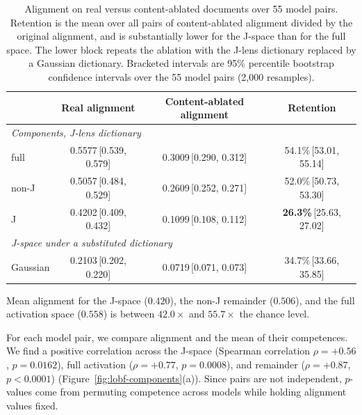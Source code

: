 \documentclass{article}
\begin{document}
\begin{table}
  \centering
  \small
  \caption{Alignment on real versus content-ablated documents over 55 model pairs. Retention is the mean over all pairs of content-ablated alignment divided by the original alignment, and is substantially lower for the J-space than for the full space. The lower block repeats the ablation with the J-lens dictionary replaced by a Gaussian dictionary. Bracketed intervals are 95\% percentile bootstrap confidence intervals over the 55 model pairs (2,000 resamples).}
  \label{tab:surrogate}
  \begin{tabular}{lccc}
    \toprule
             & Real alignment  & Content-ablated alignment  & Retention                                 \\
    \midrule
    \multicolumn{4}{l}{\emph{Components, J-lens dictionary}}                                                   \\
    full     & 0.5577\,{\tiny[0.539, 0.579]} & 0.3009\,{\tiny[0.290, 0.312]} & 54.1\%\,{\tiny[53.01, 55.14]} \\
    non-J     & 0.5057\,{\tiny[0.484, 0.529]} & 0.2609\,{\tiny[0.252, 0.271]} & 52.0\%\,{\tiny[50.73, 53.30]} \\
    J        & 0.4202\,{\tiny[0.409, 0.432]} & 0.1099\,{\tiny[0.108, 0.112]} & \textbf{26.3\%}\,{\tiny[25.63, 27.02]} \\
    \midrule
    \multicolumn{4}{l}{\emph{J-space under a substituted dictionary}}                                          \\
    Gaussian & 0.2103\,{\tiny[0.202, 0.220]} & 0.0719\,{\tiny[0.071, 0.073]} & 34.7\%\,{\tiny[33.66, 35.85]} \\
    \bottomrule
  \end{tabular}
\end{table}

Mean alignment for the J-space ($0.420$), the non-J remainder ($0.506$), and the full activation space ($0.558$) is between $42.0\times$ and $55.7\times$ the chance level.

For each model pair, we compare alignment and the mean of their competences. We find a positive correlation across the J-space (Spearman correlation $\rho = +0.56$, $p = 0.0162$), full activation ($\rho = +0.77$, $p = 0.0008$), and remainder ($\rho = +0.87$, $p < 0.0001$) (Figure~\ref{fig:lobf-components}(a)). Since pairs are not independent, $p$-values come from permuting competence across models while holding alignment values fixed.
\end{document}
